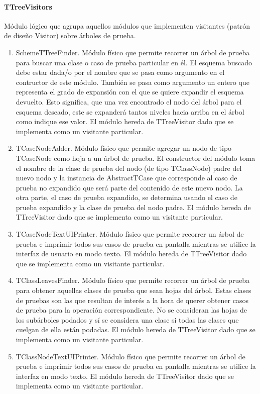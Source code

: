 \documentclass[a4paper,10pt]{report}
\begin{document}
				\paragraph{TTreeVisitors}
				Módulo lógico que agrupa aquellos módulos que implementen visitantes (patrón de diseño Visitor) sobre árboles de prueba.
					\begin{enumerate}
						\item{SchemeTTreeFinder. Módulo físico que permite recorrer un árbol de prueba para buscar una clase o caso de prueba particular en él. El esquema buscado debe estar dada/o por el nombre que se pasa como argumento en el contructor de este módulo. También se pasa como argumento un entero que representa el grado de expansión con el que se quiere expandir el esquema devuelto. Esto significa, que una vez encontrado el nodo del árbol para el esquema deseado, este se expanderá tantos niveles hacia arriba en el árbol como indique ese valor. El módulo hereda de TTreeVisitor dado que se implementa como un visitante particular.}
						\item{TCaseNodeAdder. Módulo físico que permite agregar un nodo de tipo TCaseNode como hoja a un árbol de prueba. El constructor del módulo toma el nombre de la clase de prueba del nodo (de tipo TClassNode) padre del nuevo nodo y la instancia de AbstractTCase que corresponde al caso de prueba no expandido que será parte del contenido de este nuevo nodo. La otra parte, el caso de prueba expandido, se determina usando el caso de prueba expandido y la clase de prueba del nodo padre. El módulo hereda de TTreeVisitor dado que se implementa como un visitante particular.}
						\item{TCaseNodeTextUIPrinter. Módulo físico que permite recorrer un árbol de prueba e imprimir todos sus casos de prueba en pantalla mientras se utilice la interfaz de usuario en modo texto. El módulo hereda de TTreeVisitor dado que se implementa como un visitante particular.}
						\item{TClassLeavesFinder. Módulo físico que permite recorrer un árbol de prueba para obtener aquellas clases de prueba que sean hojas del árbol. Estas clases de pruebas son las que resultan de interés a la hora de querer obtener casos de prueba para la operación correspondiente. No se consideran las hojas de los subárboles podados y sí se considera una clase si todas las clases que cuelgan de ella están podadas. El módulo hereda de TTreeVisitor dado que se implementa como un visitante particular.}
						\item{TClassNodeTextUIPrinter. Módulo físico que permite recorrer un árbol de prueba e imprimir todos sus casos de prueba en pantalla mientras se utilice la interfaz en modo texto. El módulo hereda de TTreeVisitor dado que se implementa como un visitante particular.}

\end{enumerate}
\end{document}
